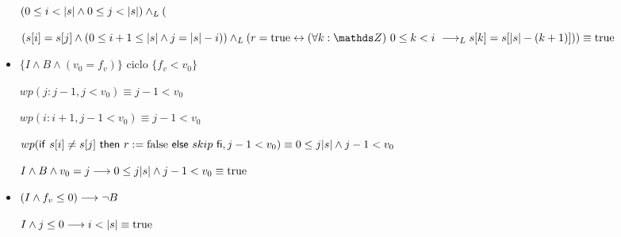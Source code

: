 \documentclass{article}
\begin{document}
\begin{itemize}
    $ (0 \leq i < |s| \wedge 0 \leq j < |s|) \land _L ($

    $ ( s[i]   =  s[j] \wedge (0 \leq i+1 \leq \longitud{s} \wedge j = \longitud{s}-i)) \yLuego (r = \True \Iff \paraTodo{k}{0}{i} \implicaLuego s[k]=s[\longitud{s}-(k+1)])) \equiv \True$

    \item $\{I \wedge B \wedge (v_{0} = f_{v})\}$ ciclo $\{f_{v} < v_{0}\}$
    
    $wp(j:j-1, j<v_{0}) \equiv j-1<v_{0}$

    $wp(i:i+1, j-1<v_{0}) \equiv j-1<v_{0}$

    $wp(\mathsf{if}\ s[i] \neq s[j]\ \mathsf{then}\ r:=\mathrm{false}\ \mathsf{else}\ skip\ \mathsf{fi}, j-1<v_{0}) \equiv 0 \leq j |s| \wedge j-1<v_{0}$

    $I \wedge B \wedge v_{0} = j \longrightarrow 0 \leq j |s| \wedge j-1<v_{0} \equiv \mathrm{true}$

    \item $(I \wedge f_{v} \leq 0) \longrightarrow \neg B$

    $I \wedge j \leq 0 \longrightarrow i < |s| \equiv \mathrm{true}$
\end{itemize}
\end{document}
